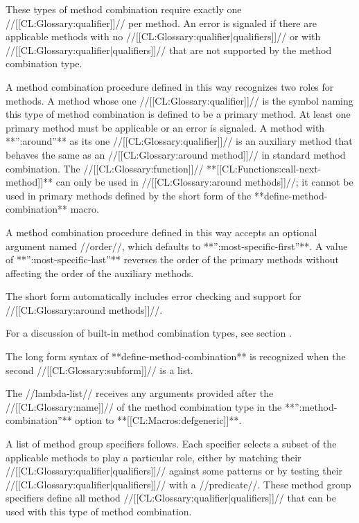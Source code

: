 \endlist

These types of method combination require exactly one //[[CL:Glossary:qualifier]]// per method. An error is signaled if there are applicable methods with no //[[CL:Glossary:qualifier|qualifiers]]// or with //[[CL:Glossary:qualifier|qualifiers]]// that are not supported by the method combination type.

A method combination procedure defined in this way recognizes two roles for methods. A method whose one //[[CL:Glossary:qualifier]]// is the symbol naming this type of method combination is defined to be a primary method. At least one primary method must be applicable or an error is signaled. A method with **'':around''** as its one //[[CL:Glossary:qualifier]]// is an auxiliary method that behaves the same as an //[[CL:Glossary:around method]]// in standard method combination. The //[[CL:Glossary:function]]// **[[CL:Functions:call-next-method]]** can only be used in //[[CL:Glossary:around methods]]//; it cannot be used in primary methods defined by the short form of the **define-method-combination** macro.

A method combination procedure defined in this way accepts an optional argument named //order//, which defaults to **'':most-specific-first''**. A value of **'':most-specific-last''** reverses the order of the primary methods without affecting the order of the auxiliary methods.

The short form automatically includes error checking and support for //[[CL:Glossary:around methods]]//.

For a discussion of built-in method combination types, see section {\secref\BuiltInMethCombTypes}.


The long form syntax of **define-method-combination** is recognized when the second //[[CL:Glossary:subform]]// is a list.

The //lambda-list// receives any arguments provided after the //[[CL:Glossary:name]]// of the method combination type in the **'':method-combination''** option to **[[CL:Macros:defgeneric]]**.

A list of method group specifiers follows. Each specifier selects a subset of the applicable methods to play a particular role, either by matching their //[[CL:Glossary:qualifier|qualifiers]]// against some patterns or by testing their //[[CL:Glossary:qualifier|qualifiers]]// with a //predicate//. These method group specifiers define all method //[[CL:Glossary:qualifier|qualifiers]]// that can be used with this type of method combination.

